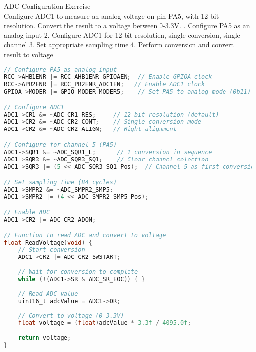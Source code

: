 \begin{example2}{ADC Configuration Exercise}\\
Configure ADC1 to measure an analog voltage on pin PA5, with 12-bit resolution. Convert the result to a voltage between 0-3.3V.
. Configure PA5 as an analog input
2. Configure ADC1 for 12-bit resolution, single conversion, single channel
3. Set appropriate sampling time
4. Perform conversion and convert result to voltage

\begin{lstlisting}[language=C, style=basesmol]
// Configure PA5 as analog input
RCC->AHB1ENR |= RCC_AHB1ENR_GPIOAEN;  // Enable GPIOA clock
RCC->APB2ENR |= RCC_PB2ENR_ADC1EN;   // Enable ADC1 clock
GPIOA->MODER |= GPIO_MODER_MODER5;    // Set PA5 to analog mode (0b11)

// Configure ADC1
ADC1->CR1 &= ~ADC_CR1_RES;     // 12-bit resolution (default)
ADC1->CR2 &= ~ADC_CR2_CONT;    // Single conversion mode
ADC1->CR2 &= ~ADC_CR2_ALIGN;   // Right alignment

// Configure for channel 5 (PA5)
ADC1->SQR1 &= ~ADC_SQR1_L;      // 1 conversion in sequence
ADC1->SQR3 &= ~ADC_SQR3_SQ1;    // Clear channel selection
ADC1->SQR3 |= (5 << ADC_SQR3_SQ1_Pos);  // Channel 5 as first conversion

// Set sampling time (84 cycles)
ADC1->SMPR2 &= ~ADC_SMPR2_SMP5;
ADC1->SMPR2 |= (4 << ADC_SMPR2_SMP5_Pos);

// Enable ADC
ADC1->CR2 |= ADC_CR2_ADON;

// Function to read ADC and convert to voltage
float ReadVoltage(void) {
    // Start conversion
    ADC1->CR2 |= ADC_CR2_SWSTART;
    
    // Wait for conversion to complete
    while (!(ADC1->SR & ADC_SR_EOC)) { }
    
    // Read ADC value
    uint16_t adcValue = ADC1->DR;
    
    // Convert to voltage (0-3.3V)
    float voltage = (float)adcValue * 3.3f / 4095.0f;
    
    return voltage;
}
\end{lstlisting}
\end{example2}